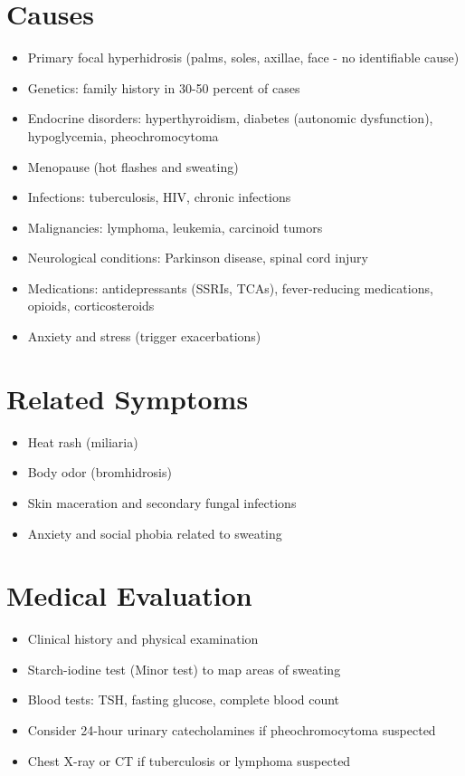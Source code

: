 \section*{Causes}
\begin{itemize}
\item Primary focal hyperhidrosis (palms, soles, axillae, face - no identifiable cause)
\item Genetics: family history in 30-50 percent of cases
\item Endocrine disorders: hyperthyroidism, diabetes (autonomic dysfunction), hypoglycemia, pheochromocytoma
\item Menopause (hot flashes and sweating)
\item Infections: tuberculosis, HIV, chronic infections
\item Malignancies: lymphoma, leukemia, carcinoid tumors
\item Neurological conditions: Parkinson disease, spinal cord injury
\item Medications: antidepressants (SSRIs, TCAs), fever-reducing medications, opioids, corticosteroids
\item Anxiety and stress (trigger exacerbations)
\end{itemize}

\section*{Related Symptoms}
\begin{itemize}
\item Heat rash (miliaria)
\item Body odor (bromhidrosis)
\item Skin maceration and secondary fungal infections
\item Anxiety and social phobia related to sweating
\end{itemize}

\section*{Medical Evaluation}
\begin{itemize}
\item Clinical history and physical examination
\item Starch-iodine test (Minor test) to map areas of sweating
\item Blood tests: TSH, fasting glucose, complete blood count
\item Consider 24-hour urinary catecholamines if pheochromocytoma suspected
\item Chest X-ray or CT if tuberculosis or lymphoma suspected
\end{itemize}

